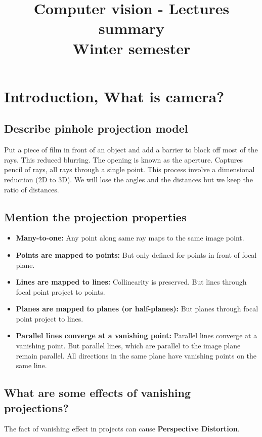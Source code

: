 \documentclass{article}
\title{Computer vision - Lectures summary \\ Winter semester}
\begin{document}
\maketitle

\section{Introduction, What is camera?}

\subsection{Describe pinhole projection model}
Put a piece of film in front of an object and add a barrier to block off most of the rays.
This reduced blurring. The opening is known as the aperture. Captures pencil of rays,  all rays through a single point. This process involve a dimensional reduction (2D to 3D). We will lose the angles and
the distances but we keep the ratio of distances.

\subsection{Mention the projection properties}
\begin{itemize}
    \item \textbf{Many-to-one: } Any point along same ray maps to the same image point.
    \item \textbf{Points are mapped to points: } But only defined for points in front of
        focal plane.
    \item \textbf{Lines are mapped to lines: } Collinearity is preserved. But lines through focal
        point project to points.
    \item \textbf{Planes are mapped to planes (or half-planes): } But planes through focal point
        project to lines.
    \item \textbf{Parallel lines converge at a vanishing point: } Parallel lines converge at a
        vanishing point. But parallel lines, which are parallel to the image plane remain parallel.
        All directions in the same plane have vanishing points on the same line.
\end{itemize}

\subsection{What are some effects of vanishing projections?}
The fact of vanishing effect in projects can cause \textbf{Perspective Distortion}.
\end{document}
